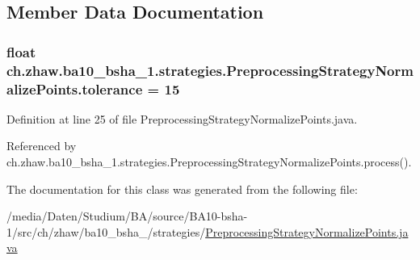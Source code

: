 \subsection{Member Data Documentation}
\hypertarget{classch_1_1zhaw_1_1ba10__bsha__1_1_1strategies_1_1PreprocessingStrategyNormalizePoints_a0b3e38f03eb2ce52c7e0a1b09c5f0355}{
\subsubsection[{tolerance}]{\setlength{\rightskip}{0pt plus 5cm}float {\bf ch.zhaw.ba10\_\-bsha\_\-1.strategies.PreprocessingStrategyNormalizePoints.tolerance} = 15}}
\label{classch_1_1zhaw_1_1ba10__bsha__1_1_1strategies_1_1PreprocessingStrategyNormalizePoints_a0b3e38f03eb2ce52c7e0a1b09c5f0355}


Definition at line 25 of file PreprocessingStrategyNormalizePoints.java.

Referenced by ch.zhaw.ba10\_\-bsha\_\-1.strategies.PreprocessingStrategyNormalizePoints.process().

The documentation for this class was generated from the following file:\begin{DoxyCompactItemize}
\item 
/media/Daten/Studium/BA/source/BA10-\/bsha-\/1/src/ch/zhaw/ba10\_\-bsha\_/strategies/\hyperlink{PreprocessingStrategyNormalizePoints_8java}{PreprocessingStrategyNormalizePoints.java}\end{DoxyCompactItemize}
